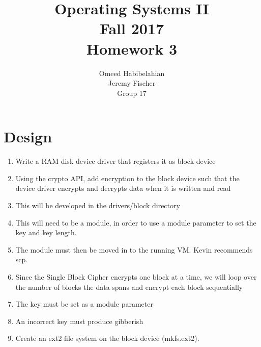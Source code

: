 \documentclass[draftclsnofoot, onecolumn, 10pt, compsoc]{IEEEtran}
\title{\textbf{Operating Systems II}\\Fall 2017\\Homework 3}
\author{Omeed Habibelahian\\Jeremy Fischer\\Group 17}
\begin{document}
	\maketitle
	\newpage
	
	\section{Design}
		\begin{enumerate}
			\item Write a RAM disk device driver that registers it as block device
			\item Using the crypto API, add encryption to the block device such that the device driver encrypts and decrypts data when it is written and read
			\item This will be developed in the drivers/block directory
			\item This will need to be a module, in order to use a module parameter to set the key and key length.
			\item The module must then be moved in to the running VM. Kevin recommends scp.
			\item Since the Single Block Cipher encrypts one block at a time, we will loop over the number of blocks the data spans and encrypt each block sequentially
			\item The key must be set as a module parameter
			\item An incorrect key must produce gibberish
			\item Create an ext2 file system on the block device (mkfs.ext2).
		\end{enumerate}
	
\end{document}
